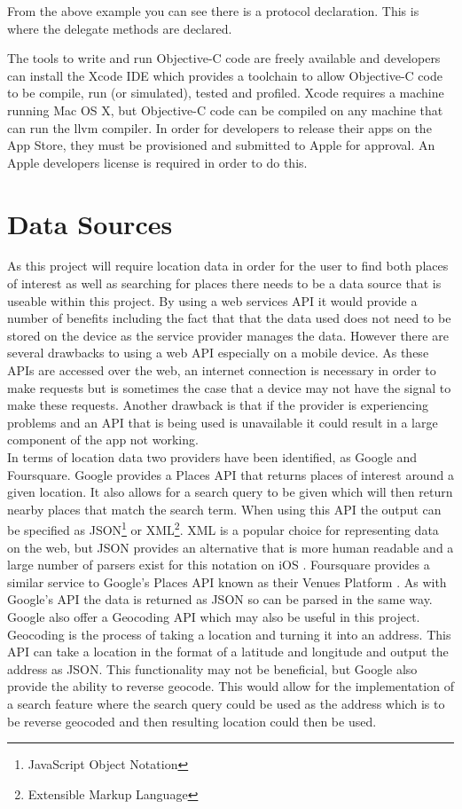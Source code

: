 \documentclass[12pt]{report}
\begin{document}
From the above example you can see there is a protocol declaration. This is where the delegate methods are declared. 

The tools to write and run Objective-C code are freely available and developers can install the Xcode IDE which provides a toolchain to allow Objective-C code to be compile, run (or simulated), tested and profiled. Xcode requires a machine running Mac OS X, but Objective-C code can be compiled on any machine that can run the llvm compiler. In order for developers to release their apps on the App Store, they must be provisioned and submitted to Apple for approval. An Apple developers license is required in order to do this.

\section{Data Sources}\label{sec:datasources}

As this project will require location data in order for the user to find both places of interest as well as searching for places there needs to be a data source that is useable within this project. By using a web services API it would provide a number of benefits including the fact that that the data used does not need to be stored on the device as the service provider manages the data. However there are several drawbacks to using a web API especially on a mobile device. As these APIs are accessed over the web, an internet connection is necessary in order to make requests but is sometimes the case that a device may not have the signal to make these requests. Another drawback is that if the provider is experiencing problems and an API that is being used is unavailable it could result in a large component of the app not working.\\

In terms of location data two providers have been identified, as Google and Foursquare. Google provides a Places API \cite{placesapi} that returns places of interest around a given location. It also allows for a search query to be given which will then return nearby places that match the search term. When using this API the output can be specified as JSON\footnote{JavaScript Object Notation} or XML\footnote{Extensible Markup Language}. XML is a popular choice for representing data on the web, but JSON provides an alternative that is more human readable and a large number of parsers exist for this notation on iOS \cite{json}. Foursquare provides a similar service to Google's Places API known as their Venues Platform \cite{foursquare}. As with Google's API the data is returned as JSON so can be parsed in the same way. Google also offer a Geocoding API \cite{geocodingapi} which may also be useful in this project. Geocoding is the process of taking a location and turning it into an address. This API can take a location in the format of a latitude and longitude and output the address as JSON. This functionality may not be beneficial, but Google also provide the ability to reverse geocode. This would allow for the implementation of a search feature where the search query could be used as the address which is to be reverse geocoded and then resulting location could then be used. 
\end{document}
